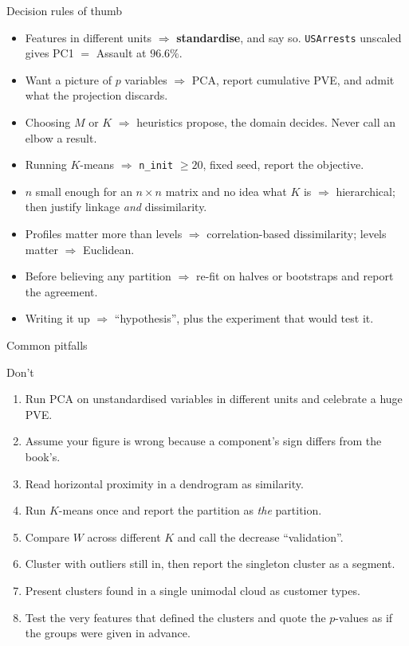 \documentclass[aspectratio=169,11pt]{beamer}
\begin{document}
\begin{frame}{Decision rules of thumb}
  \begin{itemize}
    \item Features in different units $\Rightarrow$ \textbf{standardise}, and say so.
          \texttt{USArrests} unscaled gives PC1 $=$ Assault at $96.6\%$.
    \item Want a picture of $p$ variables $\Rightarrow$ PCA, report cumulative PVE, and
          admit what the projection discards.
    \item Choosing $M$ or $K$ $\Rightarrow$ heuristics propose, the domain decides. Never
          call an elbow a result.
    \item Running $K$-means $\Rightarrow$ \texttt{n\_init} $\ge 20$, fixed seed, report the
          objective.
    \item $n$ small enough for an $n\times n$ matrix and no idea what $K$ is
          $\Rightarrow$ hierarchical; then justify linkage \emph{and} dissimilarity.
    \item Profiles matter more than levels $\Rightarrow$ correlation-based dissimilarity;
          levels matter $\Rightarrow$ Euclidean.
    \item Before believing any partition $\Rightarrow$ re-fit on halves or bootstraps and
          report the agreement.
    \item Writing it up $\Rightarrow$ ``hypothesis'', plus the experiment that would test
          it.
  \end{itemize}
\end{frame}

\begin{frame}{Common pitfalls}
  \begin{alertblock}{Don't}
    \begin{enumerate}
      \item Run PCA on unstandardised variables in different units and celebrate a huge
            PVE.
      \item Assume your figure is wrong because a component's sign differs from the book's.
      \item Read horizontal proximity in a dendrogram as similarity.
      \item Run $K$-means once and report the partition as \emph{the} partition.
      \item Compare $W$ across different $K$ and call the decrease ``validation''.
      \item Cluster with outliers still in, then report the singleton cluster as a segment.
      \item Present clusters found in a single unimodal cloud as customer types.
      \item Test the very features that defined the clusters and quote the $p$-values
            as if the groups were given in advance.
    \end{enumerate}
  \end{alertblock}
\end{frame}
\end{document}
